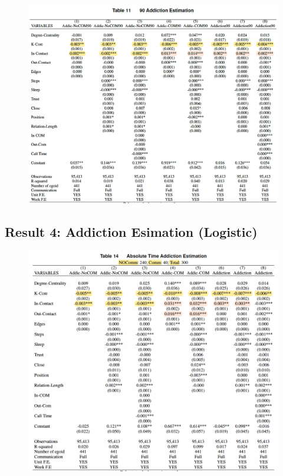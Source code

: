 \documentclass[
  letterpaper,
  DIV=11,
  numbers=noendperiod]{scrartcl}
\begin{document}
\begin{figure}

{\centering \includegraphics{images/addiction.png}

}

\end{figure}

\hypertarget{result-4-addiction-esimation-logistic-3}{%
\subsection{Result 4: Addiction Esimation
(Logistic)}\label{result-4-addiction-esimation-logistic-3}}

\begin{figure}

{\centering \includegraphics{images/addiction2-02.png}

}

\end{figure}
\end{document}
